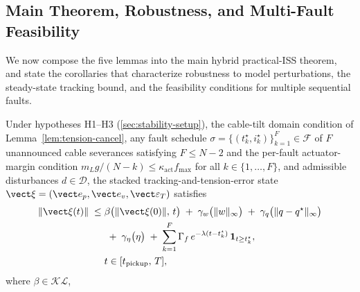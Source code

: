 \subsection{Main Theorem, Robustness, and Multi-Fault Feasibility}
\label{sec:main-theorem-and-robustness}

We now compose the five lemmas into the main hybrid practical-ISS theorem, and state the corollaries that characterize robustness to model perturbations, the steady-state tracking bound, and the feasibility conditions for multiple sequential faults.

\begin{theorem} \label{thm:hybrid-stability}
Under hypotheses H1--H3 (\cref{sec:stability-setup}), the cable-tilt domain condition of Lemma~\ref{lem:tension-cancel}, any fault schedule $\sigma = \{(t_k^\star, i_k^\star)\}_{k=1}^{F} \in \mathcal{F}$ of $F$ unannounced cable severances satisfying $F \le N - 2$ and the per-fault actuator-margin condition $m_L g/(N{-}k) \le \kappa_{\mathrm{act}} f_{\max}$ for all $k \in \{1,\dots,F\}$, and admissible disturbances $d \in \mathcal{D}$, the stacked tracking-and-tension-error state $\vect\xi = (\vect e_p, \vect e_v, \vect\varepsilon_T)$ satisfies
\begin{align}
\label{eq:iss-envelope-explicit}
  \|\vect\xi(t)\|
    \;\le\;&
      \beta\bigl(\|\vect\xi(0)\|,\,t\bigr)
      \;+\; \gamma_w\bigl(\|w\|_\infty\bigr)
      \;+\; \gamma_q\bigl(\|q - q^\star\|_\infty\bigr)
      \notag \\
    &\;+\; \gamma_\eta\bigl(\eta\bigr)
      \;+\; \sum_{k=1}^{F}
           \Gamma_f\,e^{-\lambda(t - t_k^\star)}\,
           \mathbf{1}_{t \ge t_k^\star},\\
  &t \in [t_{\mathrm{pickup}},\, T],\nonumber
\end{align}
where $\beta \in \mathcal{KL}$,

\end{theorem}
